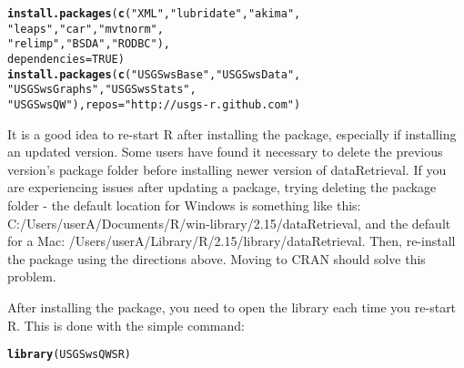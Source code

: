 \documentclass[a4paper,11pt]{article}\usepackage{graphicx, color}
\makeatletter
\newcommand{\hlfunctioncall}[1]{\textcolor[rgb]{0.501960784313725,0,0.329411764705882}{\textbf{#1}}}%
\newcommand{\hlstring}[1]{\textcolor[rgb]{0.6,0.6,1}{#1}}%
\newenvironment{kframe}{%
 \def\at@end@of@kframe{}%
 \ifinner\ifhmode%
  \def\at@end@of@kframe{\end{minipage}}%
  \begin{minipage}{\columnwidth}%
 \fi\fi%
 \def\FrameCommand##1{\hskip\@totalleftmargin \hskip-\fboxsep
 \colorbox{shadecolor}{##1}\hskip-\fboxsep
     \hskip-\linewidth \hskip-\@totalleftmargin \hskip\columnwidth}%
 \MakeFramed {\advance\hsize-\width
   \@totalleftmargin\z@ \linewidth\hsize
   \@setminipage}}%
 {\par\unskip\endMakeFramed%
 \at@end@of@kframe}
\newenvironment{knitrout}{}{} %
\makeatother
\begin{document}
\begin{knitrout}
\color{fgcolor}\begin{kframe}
\begin{alltt}
\hlfunctioncall{install.packages}(\hlfunctioncall{c}(\hlstring{"XML"}, \hlstring{"lubridate"}, \hlstring{"akima"}, 
                   \hlstring{"leaps"}, \hlstring{"car"}, \hlstring{"mvtnorm"}, 
                   \hlstring{"relimp"}, \hlstring{"BSDA"}, \hlstring{"RODBC"}), 
                 dependencies=TRUE)
\hlfunctioncall{install.packages}(\hlfunctioncall{c}(\hlstring{"USGSwsBase"},\hlstring{"USGSwsData"},
                   \hlstring{"USGSwsGraphs"},\hlstring{"USGSwsStats"},
                   \hlstring{"USGSwsQW"}), repos=\hlstring{"http://usgs-r.github.com"})
\end{alltt}
\end{kframe}
\end{knitrout}


It is a good idea to re-start R after installing the package, especially if installing an updated version. Some users have found it necessary to delete the previous version's package folder before installing newer version of dataRetrieval. If you are experiencing issues after updating a package, trying deleting the package folder - the default location for Windows is something like this: C:/Users/userA/Documents/R/win-library/2.15/dataRetrieval, and the default for a Mac: /Users/userA/Library/R/2.15/library/dataRetrieval. Then, re-install the package using the directions above. Moving to CRAN should solve this problem.

After installing the package, you need to open the library each time you re-start R.  This is done with the simple command:
\begin{knitrout}
\color{fgcolor}\begin{kframe}
\begin{alltt}
\hlfunctioncall{library}(USGSwsQWSR)
\end{alltt}
\end{kframe}
\end{knitrout}
\end{document}
